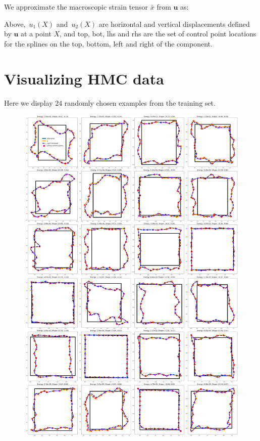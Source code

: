 We approximate the macroscopic strain tensor $\bar{x}$ from $\mathbf{u}$ as:


Above,~$u_1(X)$ and~$u_2(X)$ are horizontal and vertical displacements defined by $\mathbf{u}$ at a point $X$, and top, bot, lhs and rhs are the set of control point locations for the splines on the top, bottom, left and right of the component.

\clearpage

\section{Visualizing HMC data}
Here we display 24 randomly chosen examples from the training set.
\begin{figure}[H]
  \centering
  \includegraphics[width=.7\linewidth]{lces/hmc_viz.png}
\end{figure}

